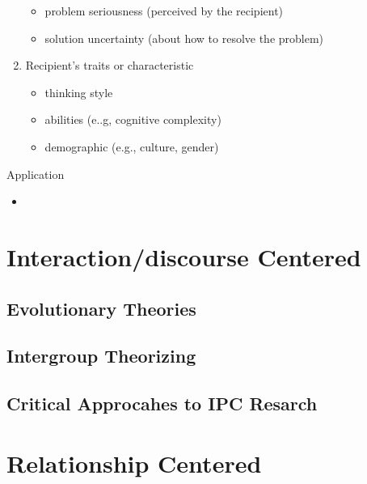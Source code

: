 \documentclass[
]{book}
\providecommand{\tightlist}{%
  \setlength{\itemsep}{0pt}\setlength{\parskip}{0pt}}
\begin{document}
\begin{enumerate}
  \begin{itemize}
  \tightlist
  \item
    problem seriousness (perceived by the recipient)
  \item
    solution uncertainty (about how to resolve the problem)
  \end{itemize}
\item
  Recipient's traits or characteristic

  \begin{itemize}
  \tightlist
  \item
    thinking style
  \item
    abilities (e..g, cognitive complexity)
  \item
    demographic (e.g., culture, gender)
  \end{itemize}
\end{enumerate}

Application

\begin{itemize}
\tightlist
\item
\end{itemize}

\hypertarget{interactiondiscourse-centered}{%
\chapter{Interaction/discourse Centered}\label{interactiondiscourse-centered}}

\hypertarget{evolutionary-theories}{%
\section{Evolutionary Theories}\label{evolutionary-theories}}

\hypertarget{intergroup-theorizing}{%
\section{Intergroup Theorizing}\label{intergroup-theorizing}}

\hypertarget{critical-approcahes-to-ipc-resarch}{%
\section{Critical Approcahes to IPC Resarch}\label{critical-approcahes-to-ipc-resarch}}

\hypertarget{relationship-centered}{%
\chapter{Relationship Centered}\label{relationship-centered}}
\end{document}
